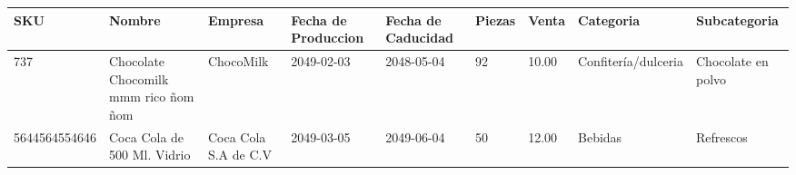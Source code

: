 \documentclass[a4paper,12pt]{article}
\begin{document}
\footnotesize  
\setlength\LTleft{-50pt} 
\setlength\LTright{-100pt}  
\begin{landscape} 
\thispagestyle{empty}
\begin{longtable}{|p{4cm}|p{2.5cm}|p{2.5cm}|p{1.8cm}|p{1.8cm}|p{1cm}|p{1cm}|p{3cm}|p{3cm}||}
\hline 
\hline
\textbf{SKU} & \textbf{Nombre} & \textbf{Empresa} & \textbf{Fecha de Produccion} & \textbf{Fecha de Caducidad} & \textbf{Piezas} & \textbf{Venta} & \textbf{Categoria} & \textbf{Subcategoria}\\ \hline \hline737 & Chocolate Chocomilk mmm rico ñom ñom & ChocoMilk & 2049-02-03 & 2048-05-04 & 92 & 10.00 & Confitería/dulceria & Chocolate en polvo \\ \hline 
5644564554646 & Coca Cola de 500 Ml. Vidrio & Coca Cola S.A de C.V & 2049-03-05 & 2049-06-04 & 50 & 12.00 & Bebidas & Refrescos \\ \hline 
\end{longtable}
\thispagestyle{empty}
\end{landscape}
\end{document}
